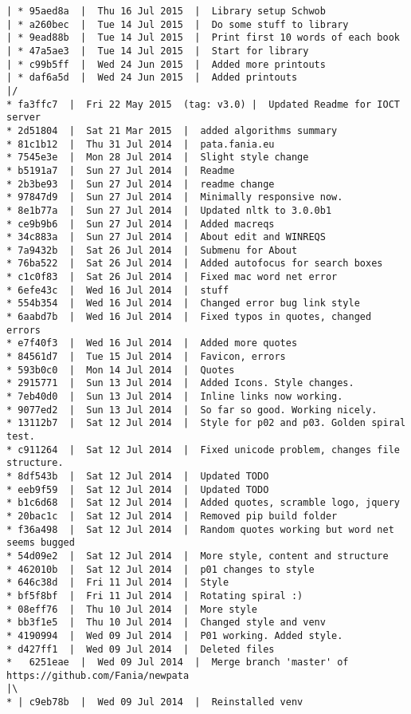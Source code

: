 \begin{verbatim}
| * 95aed8a  |  Thu 16 Jul 2015  |  Library setup Schwob
| * a260bec  |  Tue 14 Jul 2015  |  Do some stuff to library
| * 9ead88b  |  Tue 14 Jul 2015  |  Print first 10 words of each book
| * 47a5ae3  |  Tue 14 Jul 2015  |  Start for library
| * c99b5ff  |  Wed 24 Jun 2015  |  Added more printouts
| * daf6a5d  |  Wed 24 Jun 2015  |  Added printouts
|/  
* fa3ffc7  |  Fri 22 May 2015  (tag: v3.0) |  Updated Readme for IOCT server
* 2d51804  |  Sat 21 Mar 2015  |  added algorithms summary
* 81c1b12  |  Thu 31 Jul 2014  |  pata.fania.eu
* 7545e3e  |  Mon 28 Jul 2014  |  Slight style change
* b5191a7  |  Sun 27 Jul 2014  |  Readme
* 2b3be93  |  Sun 27 Jul 2014  |  readme change
* 97847d9  |  Sun 27 Jul 2014  |  Minimally responsive now.
* 8e1b77a  |  Sun 27 Jul 2014  |  Updated nltk to 3.0.0b1
* ce9b9b6  |  Sun 27 Jul 2014  |  Added macreqs
* 34c883a  |  Sun 27 Jul 2014  |  About edit and WINREQS
* 7a9432b  |  Sat 26 Jul 2014  |  Submenu for About
* 76ba522  |  Sat 26 Jul 2014  |  Added autofocus for search boxes
* c1c0f83  |  Sat 26 Jul 2014  |  Fixed mac word net error
* 6efe43c  |  Wed 16 Jul 2014  |  stuff
* 554b354  |  Wed 16 Jul 2014  |  Changed error bug link style
* 6aabd7b  |  Wed 16 Jul 2014  |  Fixed typos in quotes, changed errors
* e7f40f3  |  Wed 16 Jul 2014  |  Added more quotes
* 84561d7  |  Tue 15 Jul 2014  |  Favicon, errors
* 593b0c0  |  Mon 14 Jul 2014  |  Quotes
* 2915771  |  Sun 13 Jul 2014  |  Added Icons. Style changes.
* 7eb40d0  |  Sun 13 Jul 2014  |  Inline links now working.
* 9077ed2  |  Sun 13 Jul 2014  |  So far so good. Working nicely.
* 13112b7  |  Sat 12 Jul 2014  |  Style for p02 and p03. Golden spiral test.
* c911264  |  Sat 12 Jul 2014  |  Fixed unicode problem, changes file structure.
* 8df543b  |  Sat 12 Jul 2014  |  Updated TODO
* eeb9f59  |  Sat 12 Jul 2014  |  Updated TODO
* b1c6d68  |  Sat 12 Jul 2014  |  Added quotes, scramble logo, jquery
* 20bac1c  |  Sat 12 Jul 2014  |  Removed pip build folder
* f36a498  |  Sat 12 Jul 2014  |  Random quotes working but word net seems bugged
* 54d09e2  |  Sat 12 Jul 2014  |  More style, content and structure
* 462010b  |  Sat 12 Jul 2014  |  p01 changes to style
* 646c38d  |  Fri 11 Jul 2014  |  Style
* bf5f8bf  |  Fri 11 Jul 2014  |  Rotating spiral :)
* 08eff76  |  Thu 10 Jul 2014  |  More style
* bb3f1e5  |  Thu 10 Jul 2014  |  Changed style and venv
* 4190994  |  Wed 09 Jul 2014  |  P01 working. Added style.
* d427ff1  |  Wed 09 Jul 2014  |  Deleted files
*   6251eae  |  Wed 09 Jul 2014  |  Merge branch 'master' of https://github.com/Fania/newpata
|\  
* | c9eb78b  |  Wed 09 Jul 2014  |  Reinstalled venv

\end{verbatim}
